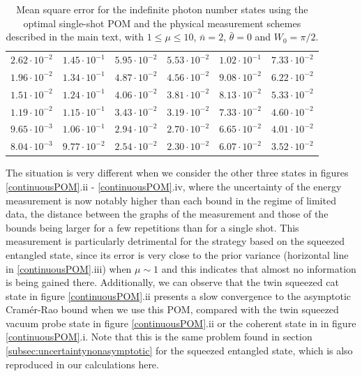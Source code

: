 \begin{table} [t]
{\begin{tabular}{|c|c|c|c|c|c|}
$2.62\cdot 10^{-2}$ & $1.45\cdot 10^{-1}$ & $5.95\cdot 10^{-2}$ & $5.53\cdot 10^{-2}$ & $1.02\cdot 10^{-1}$ & $7.33\cdot 10^{-2}$ \\
$1.96\cdot 10^{-2}$ & $1.34\cdot 10^{-1}$ & $4.87\cdot 10^{-2}$ & $4.56\cdot 10^{-2}$ & $9.08\cdot 10^{-2}$ & $6.22\cdot 10^{-2}$ \\
$1.51\cdot 10^{-2}$ & $1.24\cdot 10^{-1}$ & $4.06\cdot 10^{-2}$ & $3.81\cdot 10^{-2}$ & $8.13\cdot 10^{-2}$ & $5.33\cdot 10^{-2}$ \\
$1.19\cdot 10^{-2}$ & $1.15\cdot 10^{-1}$ & $3.43\cdot 10^{-2}$ & $3.19\cdot 10^{-2}$ & $7.33\cdot 10^{-2}$ & $4.60\cdot 10^{-2}$ \\
$9.65\cdot 10^{-3}$ & $1.06\cdot 10^{-1}$ & $2.94\cdot 10^{-2}$ & $2.70\cdot 10^{-2}$ & $6.65\cdot 10^{-2}$ & $4.01\cdot 10^{-2}$ \\
$8.04\cdot 10^{-3}$ & $9.77\cdot 10^{-2}$ & $2.54\cdot 10^{-2}$ & $2.30\cdot 10^{-2}$ & $6.07\cdot 10^{-2}$ & $3.52\cdot 10^{-2}$ \\
\hline
\end{tabular}}
\caption[Numerical results for the indefinite photon number states]{Mean square error for the indefinite photon number states using the optimal single-shot POM and the physical measurement schemes described in the main text, with $1\leqslant\mu\leqslant 10$, $\bar{n}=2$, $\bar{\theta}=0$ and $W_0=\pi/2$.}
\label{practical_POM_summary}
\end{table}

The situation is very different when we consider the other three states in figures \ref{continuousPOM}.ii - \ref{continuousPOM}.iv, where the uncertainty of the energy measurement is now notably higher than each bound in the regime of limited data, the distance between the graphs of the measurement and those of the bounds being larger for a few repetitions than for a single shot. This measurement is particularly detrimental for the strategy based on the squeezed entangled state, since its error is very close to the prior variance (horizontal line in \ref{continuousPOM}.iii) when $\mu \sim 1$ and this indicates that almost no information is being gained there. Additionally, we can observe that the twin squeezed cat state in figure \ref{continuousPOM}.ii presents a slow convergence to the asymptotic Cram\'{e}r-Rao bound when we use this POM, compared with the twin squeezed vacuum probe state in figure \ref{continuousPOM}.ii or the coherent state in in figure \ref{continuousPOM}.i. Note that this is the same problem found in section \ref{subsec:uncertaintynonasymptotic} for the squeezed entangled state, which is also reproduced in our calculations here.

